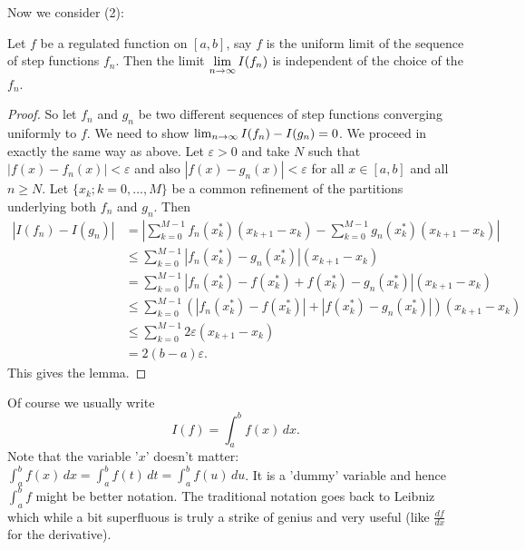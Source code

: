 \documentclass[10pt, a4paper]{article}
\begin{document}
Now we consider (2):
\begin{lemma}
    Let $f$ be a regulated function on $[a, b]$,
    say $f$ is the uniform limit of the sequence of step functions $f_n$.
    Then the limit $\displaystyle\lim_{n \rightarrow \infty} I(f_n)$ is independent of the choice of the $f_n$.

    \begin{proof}
        So let $f_n$ and $g_n$ be two different sequences of step functions converging uniformly to $f$.
        We need to show $\lim_{n \rightarrow \infty} I(f_n) - I(g_n) = 0$.
        We proceed in exactly the same way as above.
        Let $\varepsilon > 0$ and take $N$ such that $|f(x) - f_n(x)| < \varepsilon$ and also $|f(x) - g_n(x)| < \varepsilon$ for all $x \in [a, b]$ and all $n \geq N$.
        Let $\{x_k; k = 0, \dotsc, M\}$ be a common refinement of the partitions underlying both $f_n$ and $g_n$.
        Then
        \begin{align*}
            |I(f_n) - I(g_n)| &= \left|\sum_{k = 0}^{M - 1}f_n(x_k ^ {*})(x_{k + 1} - x_k) - \sum_{k = 0}^{M - 1}g_n(x_k ^ {*})(x_{k + 1} - x_k)\right| \\
            &\leq \sum_{k = 0}^{M - 1}|f_n(x_k ^ {*}) - g_n(x_k ^ {*})|(x_{k + 1} - x_k) \\
            &= \sum_{k = 0}^{M - 1}|f_n(x_k ^ {*}) - f(x_k ^ {*}) + f(x_k ^ {*}) - g_n(x_k ^ {*})|(x_{k + 1} - x_k) \\
            &\leq \sum_{k = 0}^{M - 1}(|f_n(x_k ^ {*}) - f(x_k ^ {*})| + |f(x_k ^ {*}) - g_n(x_k ^ {*})|)(x_{k + 1} - x_k) \\
            &\leq \sum_{k = 0}^{M - 1}2\varepsilon(x_{k + 1} - x_k) \\
            &= 2(b - a)\varepsilon.
        \end{align*}
        This gives the lemma.
    \end{proof}
\end{lemma}

\begin{remark}
    Of course we usually write
    \[
    I(f) = \int_{a}^{b}f(x)\,dx.
    \]
    Note that the variable '$x$' doesn't matter:
    $\int_{a}^{b}f(x)\,dx = \int_{a}^{b}f(t)\,dt = \int_{a}^{b}f(u)\,du$.
    It is a 'dummy' variable and hence $\int_{a}^{b}f$ might be better notation.
    The traditional notation goes back to Leibniz which while a bit superfluous is truly a strike of genius and very useful
    (like $\frac{df}{dx}$ for the derivative).
\end{remark}
\end{document}
